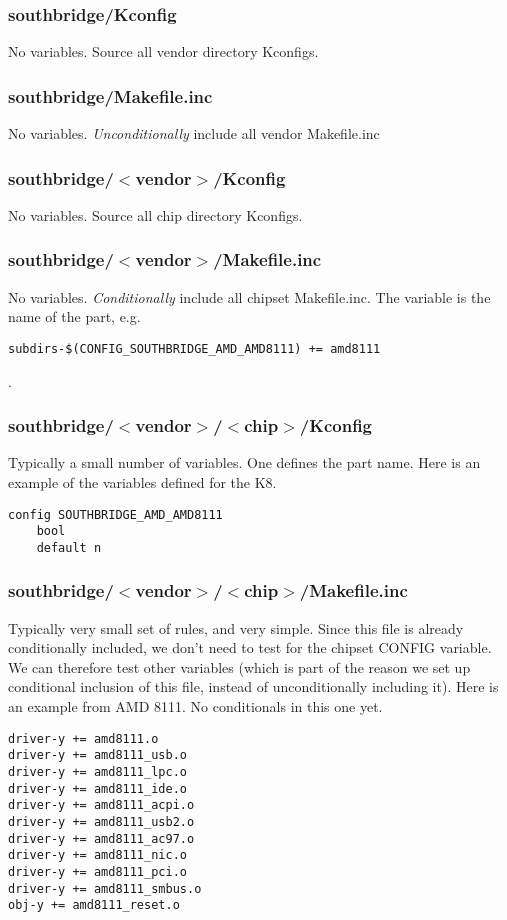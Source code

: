 \documentclass[10pt,letterpaper]{article}
\begin{document}
\subsubsection{southbridge/Kconfig}
No variables. Source all vendor directory Kconfigs.
\subsubsection{southbridge/Makefile.inc}
No variables. {\em Unconditionally} include all vendor Makefile.inc
\subsubsection{southbridge/$<$vendor$>$/Kconfig}
No variables. Source all chip directory Kconfigs.
\subsubsection{southbridge/$<$vendor$>$/Makefile.inc}
No variables. {\em Conditionally} include all chipset Makefile.inc. The variable
is the name of the part, e.g.
\begin{verbatim}
subdirs-$(CONFIG_SOUTHBRIDGE_AMD_AMD8111) += amd8111
\end{verbatim}
.
\subsubsection{southbridge/$<$vendor$>$/$<$chip$>$/Kconfig}
Typically a small number of variables. One defines the part name. Here is an example
of the variables defined for the K8.
\begin{verbatim}
config SOUTHBRIDGE_AMD_AMD8111
	bool
	default n

\end{verbatim}
\subsubsection{southbridge/$<$vendor$>$/$<$chip$>$/Makefile.inc}
Typically very small set of rules, and very simple.
Since this file is already conditionally included,
we don't need to test for the chipset CONFIG variable. We
can therefore test other variables (which is part of the reason
we set up conditional inclusion of this file, instead
of unconditionally including it). Here is an example from AMD 8111.
No conditionals in this one yet.
\begin{verbatim}
driver-y += amd8111.o
driver-y += amd8111_usb.o
driver-y += amd8111_lpc.o
driver-y += amd8111_ide.o
driver-y += amd8111_acpi.o
driver-y += amd8111_usb2.o
driver-y += amd8111_ac97.o
driver-y += amd8111_nic.o
driver-y += amd8111_pci.o
driver-y += amd8111_smbus.o
obj-y += amd8111_reset.o
\end{verbatim}
\end{document}
